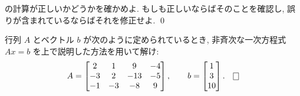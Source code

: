 \documentclass[12pt,twoside]{jarticle}
\begin{document}
\begin{question}[5点]
  の計算が正しいかどうかを確かめよ.
  もしも正しいならばそのことを確認し, 誤りが含まれているならばそれを修正せよ.
  \qed
\end{question}


\begin{question}[5点]
  \label{q:sol-inhom-1}
  行列 $A$ とベクトル $b$ が次のように定められているとき, 
  非斉次な一次方程式 $Ax=b$ を上で説明した方法を用いて解け:
  \begin{equation*}
    A = 
    \begin{bmatrix}
       2 &  1 &   9 & -4 \\
      -3 &  2 & -13 & -5 \\
      -1 & -3 &  -8 &  9 \\
    \end{bmatrix},
    \qquad
    b =
    \begin{bmatrix}
       1 \\
       3 \\
      10 \\
    \end{bmatrix}.
    \qed
  \end{equation*}
\end{question}
\end{document}
